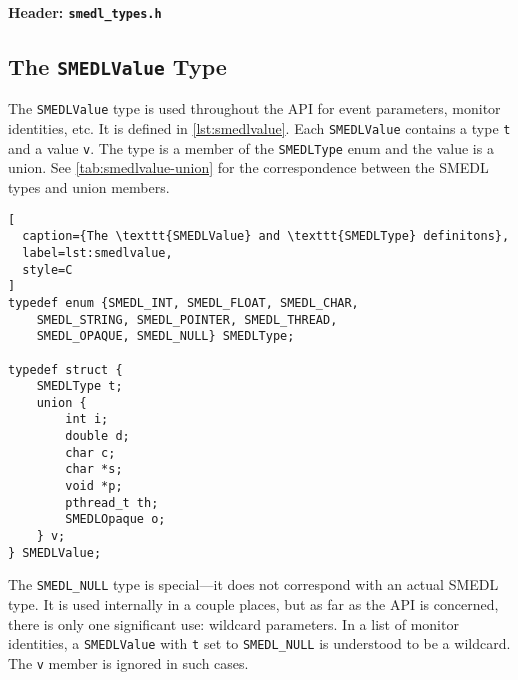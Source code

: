 \documentclass[paper=letter,titlepage,captions=tableheading]{scrartcl}
\begin{document}
\textbf{Header: \texttt{smedl\_types.h}}

\subsection{The \texttt{SMEDLValue} Type}
\label{subsec:smedlvalue}

The \texttt{SMEDLValue} type is used throughout the API for event parameters,
monitor identities, etc. It is defined in \autoref{lst:smedlvalue}. Each 
\texttt{SMEDLValue} contains a type \texttt{t} and a value \texttt{v}. The type
is a member of the \texttt{SMEDLType} enum and the value is a union. See
\autoref{tab:smedlvalue-union} for the correspondence between the SMEDL types
and union members.

\begin{lstlisting}[
  caption={The \texttt{SMEDLValue} and \texttt{SMEDLType} definitons},
  label=lst:smedlvalue,
  style=C
]
typedef enum {SMEDL_INT, SMEDL_FLOAT, SMEDL_CHAR,
    SMEDL_STRING, SMEDL_POINTER, SMEDL_THREAD,
    SMEDL_OPAQUE, SMEDL_NULL} SMEDLType;

typedef struct {
    SMEDLType t;
    union {
        int i;
        double d;
        char c;
        char *s;
        void *p;
        pthread_t th;
        SMEDLOpaque o;
    } v;
} SMEDLValue;
\end{lstlisting}


The \texttt{SMEDL\_NULL} type is special---it does not correspond with an
actual SMEDL type. It is used internally in a couple places, but as far as the
API is concerned, there is only one significant use: wildcard parameters. In a
list of monitor identities, a \texttt{SMEDLValue} with \texttt{t} set to
\texttt{SMEDL\_NULL} is understood to be a wildcard. The \texttt{v} member is
ignored in such cases.
\end{document}
